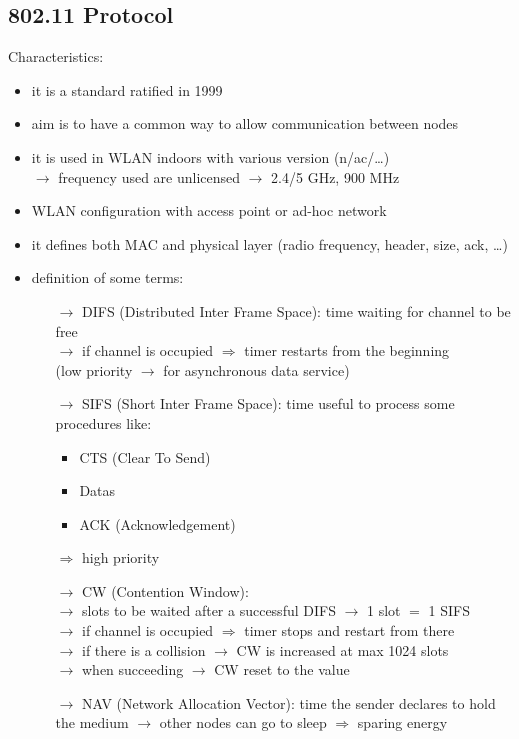 \subsection{802.11 Protocol}
Characteristics:
\begin{itemize}
    \item it is a standard ratified in 1999
    \item aim is to have a common way to allow communication between nodes
    \item it is used in WLAN indoors with various version (n/ac/\dots)\\
    $\rightarrow$ frequency used are unlicensed $\rightarrow$ 2.4/5 GHz, 900 MHz
    \item WLAN configuration with access point or ad-hoc network
    \item it defines both MAC and physical layer (radio frequency, header, size, ack, \dots)
    \item definition of some terms:
    \begin{itemize}
        \item[$\rightarrow$] DIFS (Distributed Inter Frame Space): time waiting for channel to be free\\
        $\rightarrow$ if channel is occupied $\Rightarrow$ timer restarts from the beginning\\
        (low priority $\rightarrow$ for asynchronous data service)
        \item[$\rightarrow$] SIFS (Short Inter Frame Space): time useful to process some procedures like:
        \begin{itemize}
            \item CTS (Clear To Send)
            \item Datas
            \item ACK (Acknowledgement)
        \end{itemize}
        $\Rightarrow$ high priority
        \item[$\rightarrow$] CW (Contention Window):\\
        $\rightarrow$ slots to be waited after a successful DIFS
        $\rightarrow$ 1 slot $=$ 1 SIFS\\$\rightarrow$ if channel is occupied
        $\Rightarrow$ timer stops and restart from there\\
        $\rightarrow$ if there is a collision $\rightarrow$ CW is increased at max 1024 slots\\
        $\rightarrow$ when succeeding $\rightarrow$ CW reset to the value
        \item[$\rightarrow$] NAV (Network Allocation Vector): time the sender declares to hold\\the medium $\rightarrow$ other
        nodes can go to sleep $\Rightarrow$ sparing energy
    \end{itemize}
\end{itemize}
